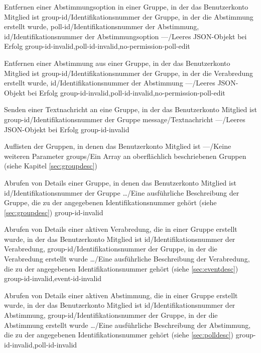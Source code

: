\documentclass[parskip=full,11pt]{scrartcl}
\begin{document}
{Entfernen einer Abstimmungsoption in einer Gruppe, in der das Benutzerkonto
Mitglied ist}
{group-id/Identifikationsnummer der Gruppe{,} in der die Abstimmung erstellt
wurde,
poll-id/Identifikationsnummer der Abstimmung,
id/Identifikationsnummer der Abstimmungsoption}
{---/Leeres JSON-Objekt bei Erfolg}
{group-id-invalid,poll-id-invalid,no-permission-poll-edit}

{Entfernen einer Abstimmung aus einer Gruppe, in der das Benutzerkonto Mitglied
ist}
{group-id/Identifikationsnummer der Gruppe{,} in der die Verabredung erstellt
wurde,
id/Identifikationsnummer der Abstimmung}
{---/Leeres JSON-Objekt bei Erfolg}
{group-id-invalid,poll-id-invalid,no-permission-poll-edit}

{Senden einer Textnachricht an eine Gruppe, in der das Benutzerkonto Mitglied
ist}
{group-id/Identifikationsnummer der Gruppe
message/Textnachricht} %
{---/Leeres JSON-Objekt bei Erfolg}
{group-id-invalid}

{Auflisten der Gruppen, in denen das Benutzerkonto Mitglied ist}
{---/Keine weiteren Parameter}
{groups/Ein Array an oberflächlich beschriebenen Gruppen (siehe
Kapitel \ref{sec:groupdesc})}
{}

{Abrufen von Details einer Gruppe, in denen das Benutzerkonto Mitglied ist}
{id/Identifikationsnummer der Gruppe}
{\dots/Eine ausführliche Beschreibung der Gruppe{,} die zu der angegebenen
Identifikationsnummer gehört (siehe \ref{sec:groupdesc})}
{group-id-invalid}

{Abrufen von Details einer aktiven Verabredung, die in einer Gruppe erstellt
wurde, in der das Benutzerkonto Mitglied ist}
{id/Identifikationsnummer der Verabredung,
group-id/Identifikationsnummer der Gruppe{,} in der die Verabredung erstellt
wurde}
{\dots/Eine ausführliche Beschreibung der Verabredung{,} die zu der angegebenen
Identifikationsnummer gehört (siehe \ref{sec:eventdesc})}
{group-id-invalid,event-id-invalid}

{Abrufen von Details einer aktiven Abstimmung, die in einer Gruppe erstellt
wurde, in der das Benutzerkonto Mitglied ist}
{id/Identifikationsnummer der Abstimmung,
group-id/Identifikationsnummer der Gruppe{,} in der die Abstimmung erstellt
wurde}
{\dots/Eine ausführliche Beschreibung der Abstimmung{,} die zu der angegebenen
Identifikationsnummer gehört (siehe \ref{sec:polldesc})}
{group-id-invalid,poll-id-invalid}
\end{document}
